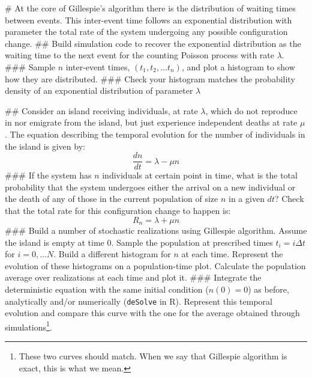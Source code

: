 \begin{easylist}[enumerate]
# At the core of Gillespie's algorithm there is the distribution of waiting times between events. This inter-event time follows an exponential distribution with parameter the total rate of the system undergoing any possible configuration change. 
## Build simulation code to recover the exponential distribution as the waiting time to the next event for the counting Poisson process with rate $\lambda$.
###  Sample $n$ inter-event times, $(t_1, t_2, ... t_n)$, and plot a histogram to show how they are distributed.
###  Check your histogram matches the probability density of an exponential distribution of parameter $\lambda$

## Consider an island receiving individuals, at rate $\lambda$, which do not reproduce in nor emigrate from the island, but just experience independent deaths at rate $\mu$. The equation describing the temporal evolution for the number of individuals in the island is given by:
$$ \frac{dn}{dt} = \lambda - \mu n $$
### If the system has $n$ individuals at certain point in time, what is the total probability that the system undergoes either the arrival on a new individual or the  death of any of those in the current population of size $n$ in a given $dt$? Check that the total rate for this configuration change to happen is:
$$R_n = \lambda + \mu n$$ 
### Build a number of stochastic realizations using Gillespie algorithm. Assume the island is empty at time 0. Sample the population at prescribed times $t_i = i \Delta t$ for $i=0, \dots N$. Build a different histogram for $n$ at each time. Represent the evolution of these histograms on a population-time plot. Calculate the population average over realizations at each time and plot it. 
### Integrate the deterministic equation with the same initial condition ($n(0)=0$) as before, analytically and/or numerically ({\tt deSolve} in R). Represent this temporal evolution and compare this curve with the one for the average obtained through simulations\footnote{These two curves should match. When we say that Gillespie algorithm is exact, this is what we mean.}.
\end{easylist}

